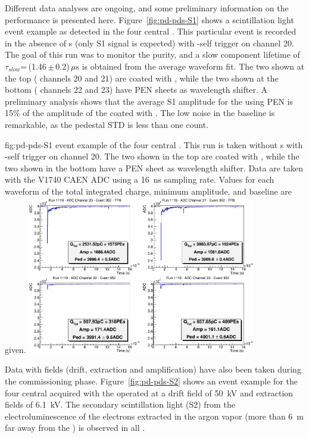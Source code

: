 Different data analyses are ongoing, and some preliminary information on the   performance is presented here. Figure~\ref{fig:pd-pds-S1} shows a scintillation light event example as detected in the four central . This particular event is recorded in the absence of \efield{}s (only S1 signal is expected) with -self trigger on  channel 20. The goal of this run was to monitor the  purity, and a slow component lifetime of $\tau_{slow}$=\,(1.46\,$\pm$\,0.2)\,$\mu$s is obtained from the average waveform fit. The two  shown at the top ( channels 20 and 21) are coated with , while the two shown at the bottom ( channels 22 and 23) have PEN sheets as wavelength shifter. A preliminary analysis shows that the average S1 amplitude for the  using PEN is 15\% of the amplitude of the  coated with . The low noise in the baseline is remarkable, as the pedestal STD is less than one  count. 

\begin{dunefigure}{fig:pd-pds-S1} { event example of the four central . This run is taken without \efield{}s with -self trigger on  channel 20. The two  shown in the top are coated with , while the two shown in the bottom have a PEN sheet as wavelength shifter. Data are taken with the V1740 CAEN ADC using a \SI{16}{ns} sampling rate. Values for each waveform of the total integrated charge, minimum amplitude, and baseline are given.}
\includegraphics[width=0.75\textwidth]{graphics/dppd_S1.png}
\end{dunefigure}

Data with fields (drift, extraction and amplification) have also been taken during the commissioning phase. Figure~\ref{fig:pd-pds-S2} shows an event example for the four central  acquired with the  operated at a drift field of \SI{50}{kV} and extraction fields of \SI{6.1}{kV}. The secondary scintillation light (S2) from the electroluminescence of the electrons extracted in the argon vapor (more than \SI{6}{m} far away from the ) is observed in all .

